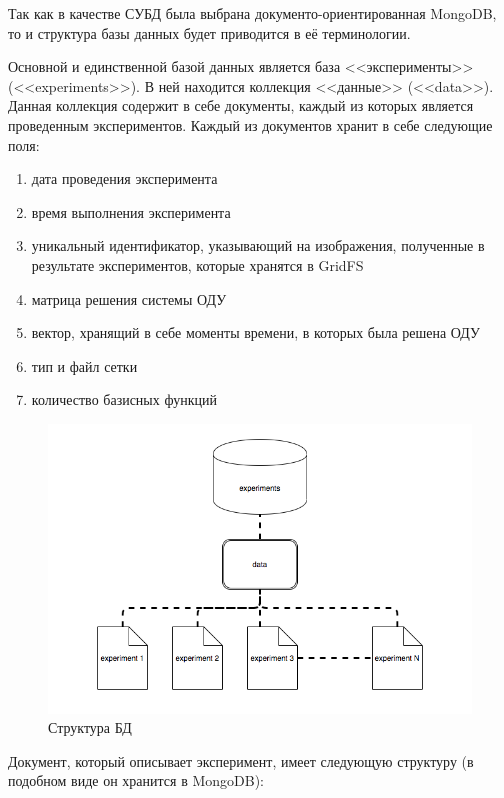 \documentclass[14pt]{extreport}
\begin{document}
Так как в качестве СУБД была выбрана документо-ориентированная MongoDB, то и структура базы данных будет приводится в её терминологии. 

Основной и единственной базой данных является база <<эксперименты>> (<<experiments>>). В ней находится коллекция  <<данные>> (<<data>>). Данная коллекция содержит в себе документы, каждый из которых является проведенным экспериментов. Каждый из документов хранит в себе следующие поля:

\begin{enumerate}
\item дата проведения эксперимента
\item время выполнения эксперимента
\item уникальный идентификатор, указывающий на изображения, полученные в результате экспериментов, которые хранятся в GridFS
\item матрица решения системы ОДУ
\item вектор, хранящий в себе моменты времени, в которых была решена ОДУ
\item тип и файл сетки
\item количество базисных функций
\end{enumerate}


\begin{figure}[H]
\centerline{
\includegraphics[width=1.0\linewidth]{images/database}}
\caption{Структура БД}
\label{img:database}
\end{figure}

Документ, который описывает эксперимент, имеет следующую структуру (в подобном виде он хранится в MongoDB):

\begin{minipage}{\linewidth}

\end{minipage}
\end{document}
